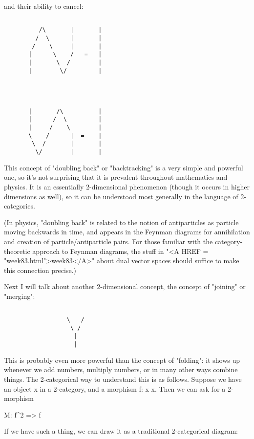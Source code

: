 and their ability to cancel:


\begin{verbatim}

          /\       |       |   
         /  \      |       |
        /    \     |       |
       |      \    /   =   |
       |       \  /        |
       |        \/         |




       |       /\          |
       |      /  \         |
       |     /    \        |
       \    /      |  =    |
        \  /       |       |
         \/        |       |

\end{verbatim}
    
This concept of "doubling back" or "backtracking" is a
very simple and powerful one, so it's not surprising that it 
is prevalent throughout mathematics and physics.  It is an
essentially 2-dimensional phenomenon (though it occurs in higher
dimensions as well), so it can be understood most generally in the 
language of 2-categories.  

(In physics, "doubling back" is related to the notion of antiparticles
as particle moving backwards in time, and appears in the Feynman diagrams
for annihilation and creation of particle/antiparticle pairs.  For
those familiar with the category-theoretic approach to Feynman diagrams, 
the stuff in "<A HREF = "week83.html">week83</A>" about dual vector spaces should suffice to make 
this connection precise.)  

Next I will talk about another 2-dimensional concept, the concept
of "joining" or "merging":


\begin{verbatim}

                  \   /
                   \ /
                    |
                    |

\end{verbatim}
    
This is probably even more powerful than the concept of "folding":
it shows up whenever we add numbers, multiply numbers, or in many
other ways combine things.  The 2-categorical way to understand
this is as follows.  Suppose we have an object x in a 2-category,
and a morphism f: x \to  x.   Then we can ask for a 2-morphism 

                M: f^{2} => f

If we have such a thing, we can draw it as a traditional 2-categorical
diagram:

